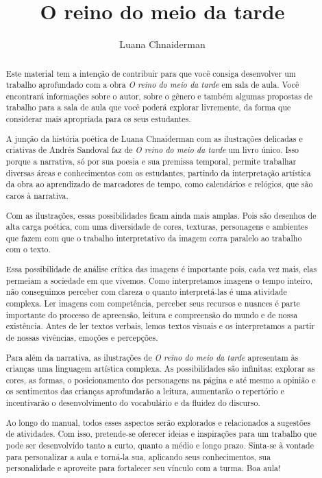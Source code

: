 \documentclass[11pt]{extarticle}
\newcommand{\AutorLivro}{Luana Chnaiderman}
\newcommand{\TituloLivro}{O reino do meio da tarde}
\newcommand{\colaborador}{Paulo Pompermaier}
\begin{document}
\title{\TituloLivro}
\author{\AutorLivro}
\def\authornotes{\colaborador}

\date{}
\maketitle

\tableofcontents


\begin{abstract}
Este material tem a intenção de contribuir para que você consiga desenvolver um trabalho aprofundado com a obra \textit{O reino do meio da tarde} em sala de aula.
Você encontrará informações sobre o autor, sobre o gênero e também 
algumas propostas de trabalho para a sala de aula que você poderá explorar livremente, 
da forma que considerar mais apropriada para os seus estudantes.

A junção da história poética de Luana Chnaiderman com as ilustrações delicadas e criativas de Andrés Sandoval faz de \textit{O reino do meio da tarde} um livro único. Isso porque a narrativa, só por sua poesia e sua premissa temporal, permite trabalhar diversas áreas e conhecimentos com os estudantes, partindo da interpretação artística da obra ao aprendizado de marcadores de tempo, como calendários e relógios, que são caros à narrativa.

Com as ilustrações, essas possibilidades ficam ainda mais amplas. Pois são desenhos de alta carga poética, com uma diversidade de cores, texturas, personagens e ambientes que fazem com que o trabalho interpretativo da imagem corra paralelo ao trabalho com o texto. 

Essa possibilidade de análise crítica das imagens é importante pois, cada vez mais, elas permeiam a sociedade em que vivemos. Como interpretamos 
imagens o tempo inteiro, não conseguimos perceber com clareza o quanto 
interpretá-las é uma atividade complexa. Ler imagens com competência, 
perceber seus recursos e nuances é parte importante do processo de apreensão, 
leitura e compreensão do mundo e de nossa existência. Antes de ler textos 
verbais, lemos textos visuais e os interpretamos a partir de nossas vivências, 
emoções e percepções.

Para além da narrativa, as ilustrações de \textit{O reino do meio da tarde} 
apresentam às crianças uma linguagem artística complexa.
As possibilidades são infinitas: explorar as cores, as formas, o posicionamento dos personagens na página e até mesmo a opinião e os sentimentos das crianças 
aprofundarão a leitura, aumentarão o repertório e incentivarão o desenvolvimento do vocabulário e da fluidez do discurso.


Ao longo do manual, todos esses aspectos serão explorados e relacionados a sugestões de atividades. Com isso, pretende-se oferecer ideias e inspirações para um trabalho que pode ser desenvolvido tanto a curto, quanto a médio e longo prazo. Sinta-se à vontade para personalizar a aula e torná-la sua, aplicando seus conhecimentos, sua 
personalidade e aproveite para fortalecer seu vínculo com a turma.
Boa aula!
\end{abstract}
\end{document}
